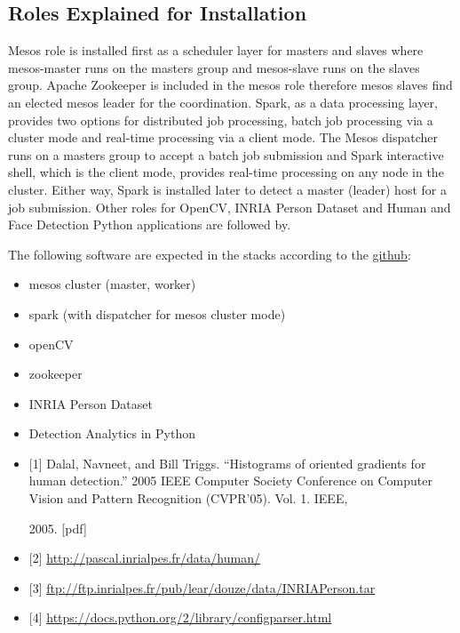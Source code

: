 \subsection{Roles Explained for
Installation}\label{roles-explained-for-installation}

Mesos role is installed first as a scheduler layer for masters and
slaves where mesos-master runs on the masters group and mesos-slave runs
on the slaves group. Apache Zookeeper is included in the mesos role
therefore mesos slaves find an elected mesos leader for the
coordination. Spark, as a data processing layer, provides two options
for distributed job processing, batch job processing via a cluster mode
and real-time processing via a client mode. The Mesos dispatcher runs on
a masters group to accept a batch job submission and Spark interactive
shell, which is the client mode, provides real-time processing on any
node in the cluster. Either way, Spark is installed later to detect a
master (leader) host for a job submission. Other roles for OpenCV, INRIA
Person Dataset and Human and Face Detection Python applications are
followed by.

The following software are expected in the stacks according to the
\href{https://github.com/futuresystems/pedestrian-and-face-detection}{github}:

\begin{itemize}

\item
  mesos cluster (master, worker)
\item
  spark (with dispatcher for mesos cluster mode)
\item
  openCV
\item
  zookeeper
\item
  INRIA Person Dataset
\item
  Detection Analytics in Python
\item
  {[}1{]} Dalal, Navneet, and Bill Triggs. ``Histograms of oriented
  gradients for human detection.'' 2005 IEEE Computer Society Conference
  on Computer Vision and Pattern Recognition (CVPR'05). Vol. 1. IEEE,

  2005. {[}pdf{]}
\item
  {[}2{]} \url{http://pascal.inrialpes.fr/data/human/}
\item
  {[}3{]}
  \url{ftp://ftp.inrialpes.fr/pub/lear/douze/data/INRIAPerson.tar}
\item
  {[}4{]} \url{https://docs.python.org/2/library/configparser.html}
\end{itemize}

